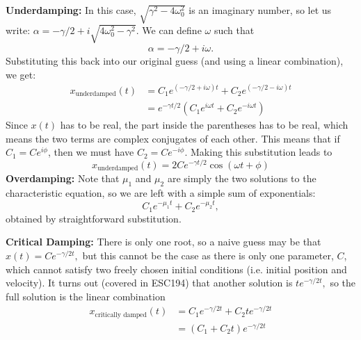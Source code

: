 \documentclass{article}
\begin{document}
\textbf{Underdamping:} In this case, $\sqrt{\gamma^2-4\omega_0^2}$ is an imaginary number, so let us write: $\alpha = -\gamma/2 + i\sqrt{4\omega_0^2-\gamma^2}$. We can define $\omega$ such that 
\begin{equation}
    \alpha = -\gamma/2 + i\omega.
\end{equation}
Substituting this back into our original guess (and using a linear combination), we get: 
\begin{align}
    x_\text{underdamped}(t) &= C_1e^{(-\gamma/2 + i\omega)t}+C_2e^{(-\gamma/2 - i\omega)t} \\ 
    &= e^{-\gamma t/2}\left(C_1e^{i\omega t} + C_2e^{-i\omega t}\right)
\end{align}
Since $x(t)$ has to be real, the part inside the parentheses has to be real, which means the two terms are complex conjugates of each other. This means that if $C_1=Ce^{i\phi}$, then we must have $C_2 =Ce^{-i\phi}$. Making this substitution leads to 
\begin{equation}
    x_\text{underdamped}(t) = 2Ce^{-\gamma t/2}\cos(\omega t+\phi)
\end{equation}
\textbf{Overdamping:} Note that $\mu_1$ and $\mu_2$ are simply the two solutions to the characteristic equation, so we are left with a simple sum of exponentials: 
\begin{equation}
    C_1e^{-\mu_1 t} + C_2e^{-\mu_2 t},
\end{equation}
obtained by straightforward substitution.

\textbf{Critical Damping:} There is only one root, so a naive guess may be that $x(t) = Ce^{-\gamma/2 t},$ but this cannot be the case as there is only one parameter, $C$, which cannot satisfy two freely chosen initial conditions (i.e. initial position and velocity). It turns out (covered in ESC194) that another solution is $te^{-\gamma/2 t},$ so the full solution is the linear combination 
\begin{align}
    x_\text{critically damped}(t) &= C_1e^{-\gamma/2 t} + C_2te^{-\gamma/2 t} \\ 
    &= (C_1+C_2t)e^{-\gamma/2 t}
\end{align}
\end{document}
